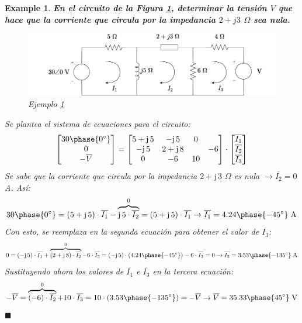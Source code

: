 \documentclass[11pt]{book} %
\numberwithin{dummy}{section}
\theoremstyle{ocrenumbox}
\theoremstyle{blacknumex}
\newtheorem{exampleT}{Example}[chapter]
\theoremstyle{blacknumbox}
\theoremstyle{ocrenum}
\newenvironment{example}{\begin{exampleT}}{\hfill{\tiny\ensuremath{\blacksquare}}\end{exampleT}}
\begin{document}
	\vspace{4mm}
	\begin{example}\label{ej.2-6}
		\textbf{En el circuito de la Figura \ref{fig.ejercicio6_tema01}, determinar la tensión $V$ que hace que la corriente que circula por la impedancia $2+j3$ $\Omega$ sea nula.}
		\begin{figure}[h!]
			\centering
			\includegraphics[width=0.7\linewidth]{../figs/ejercicio6_tema01.pdf}
			\caption{Ejemplo \ref{ej.2-6}}
			\label{fig.ejercicio6_tema01}
		\end{figure}
		
		Se plantea el sistema de ecuaciones para el circuito: 
		\begin{equation*}
			\begin{bmatrix}
				30\phase{0^\circ} \\
				0 \\
				-\overline{V}
			\end{bmatrix}
			=
			\begin{bmatrix}
				5+\mathrm{j}\,5 & -\mathrm{j}\,5 & 0 \\
				-\mathrm{j}\,5 & 2+\mathrm{j}\,8 & & -6 \\
				0 & -6 & 10 \\
			\end{bmatrix}
			\cdot 
			\begin{bmatrix}
				\overline{I_1} \\
				\overline{I_2} \\
				\overline{I_3}
			\end{bmatrix}
		\end{equation*}
		Se sabe que la corriente que circula por la impedancia $2+\mathrm{j}\,3$ $\Omega$ es nula $\rightarrow \overline{I_2}=0$ A. Así: 
		\begin{equation*}
			30\phase{0^\circ} = (5+\mathrm{j}\,5)\cdot \overline{I_1} - \overbrace{\mathrm{j}\,5\cdot \overline{I_2}}^0 = (5+\mathrm{j}\,5)\cdot \overline{I_1} \rightarrow \overline{I_1} = 4.24\phase{-45^\circ}\;\text{A}
		\end{equation*}
		Con esto, se reemplaza en la segunda ecuación para obtener el valor de $\overline{I_3}$:
		\begin{equation*}
			0 = (-\mathrm{j}\,5)\cdot \overline{I_1} + \overbrace{(2+\mathrm{j}\,8)\cdot \overline{I_2}}^0 -6\cdot \overline{I_3} = (-\mathrm{j}\,5)\cdot (4.24\phase{-45^\circ}) - 6 \cdot \overline{I_3} = 0 \rightarrow \overline{I_3} = 3.53\phase{-135^\circ}\;\text{A}
		\end{equation*}
		Sustituyendo ahora los valores de $\overline{I_1}$ e $\overline{I_3}$ en la tercera ecuación: 
		\begin{equation*}
			-\overline{V}=\overbrace{(-6)\cdot \overline{I_2}}^0 +10\cdot \overline{I_3} = 10 \cdot (3.53\phase{-135^\circ}) = -\overline{V} \rightarrow \overline{V} = 35.33\phase{45^\circ}\;\text{V}
		\end{equation*}
	\end{example}
	
\end{document}
